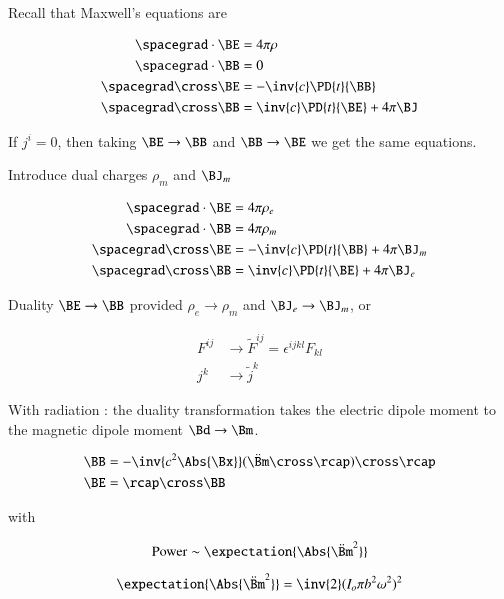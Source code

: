 Recall that Maxwell's equations are

\begin{align}\label{eqn:relativisticElectrodynamicsT8:190}
\spacegrad \cdot \BE &= 4 \pi \rho \\
\spacegrad \cdot \BB &= 0 \\
\spacegrad \cross \BE &= -\inv{c} \PD{t}{\BB} \\
\spacegrad \cross \BB &= \inv{c} \PD{t}{\BE} + 4 \pi \BJ
\end{align}

If $j^i = 0$, then taking $\BE \rightarrow \BB$ and $\BB \rightarrow \BE$ we get the same equations.

Introduce dual charges $\rho_m$ and $\BJ_m$

\begin{align}\label{eqn:relativisticElectrodynamicsT8:210}
\spacegrad \cdot \BE &= 4 \pi \rho_e \\
\spacegrad \cdot \BB &= 4 \pi \rho_m \\
\spacegrad \cross \BE &= -\inv{c} \PD{t}{\BB} + 4 \pi \BJ_m\\
\spacegrad \cross \BB &= \inv{c} \PD{t}{\BE} + 4 \pi \BJ_e
\end{align}

Duality $\BE \rightarrow \BB$ provided $\rho_e \rightarrow \rho_m$ and $\BJ_e \rightarrow \BJ_m$, or

\begin{align}\label{eqn:relativisticElectrodynamicsT8:230}
F^{i j} &\rightarrow \tilde{F}^{i j} = \epsilon^{i j k l} F_{k l} \\
j^{k} &\rightarrow \tilde{j}^k
\end{align}

With radiation : the duality transformation takes the electric dipole moment to the magnetic dipole moment $\Bd \rightarrow \Bm$.

\begin{align}\label{eqn:relativisticElectrodynamicsT8:250}
\BB &= -\inv{c^2 \Abs{\Bx}} (\ddot{\Bm} \cross \rcap) \cross \rcap \\
\BE &= \rcap \cross \BB
\end{align}

with

\begin{equation}\label{eqn:relativisticElectrodynamicsT8:270}
\text{Power} \sim \expectation{\Abs{\ddot{\Bm}^2}}
\end{equation}

\begin{equation}\label{eqn:relativisticElectrodynamicsT8:290}
\expectation{\Abs{\ddot{\Bm}^2}}
= \inv{2} (I_o \pi b^2 \omega^2)^2
\end{equation}

